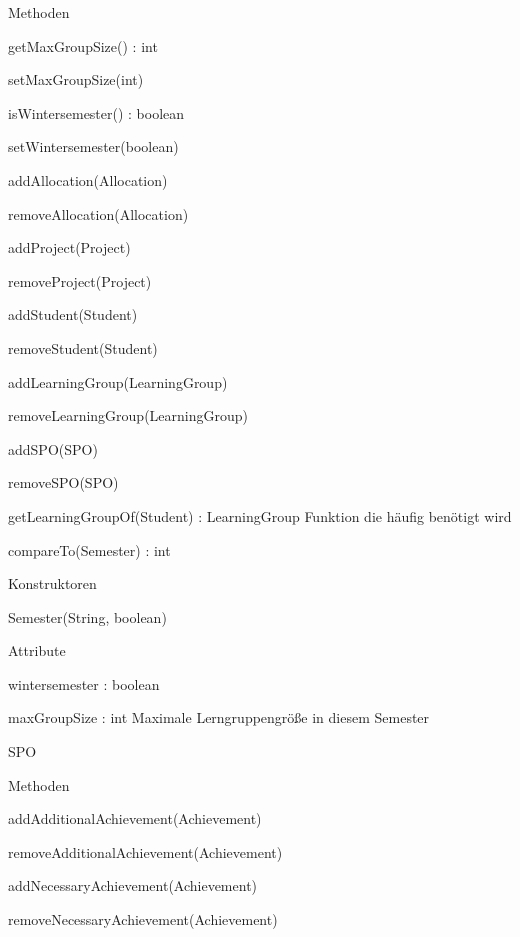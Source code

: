 \documentclass[parskip=full]{scrartcl}
\newcommand{\changeDescription}[1]{{\newline\color{black}\normalfont #1}}
\begin{document}
\begin{itemPackage}
\begin{itemClass}
\begin{itemClassSub}
\item Methoden
\begin{itemPlus}
\item getMaxGroupSize() : int
\item setMaxGroupSize(int)
\item isWintersemester() : boolean
\item setWintersemester(boolean)
\item addAllocation(Allocation)
\item removeAllocation(Allocation)
\item addProject(Project)
\item removeProject(Project)
\item addStudent(Student)
\item removeStudent(Student)
\item addLearningGroup(LearningGroup)
\item removeLearningGroup(LearningGroup)
\item addSPO(SPO)
\item removeSPO(SPO)
\item getLearningGroupOf(Student) : LearningGroup
\changeDescription{Funktion die häufig benötigt wird}
\item compareTo(Semester) : int
\end{itemPlus}
\item Konstruktoren
\begin{itemPlus}
\item Semester(String, boolean)
\end{itemPlus}
\item Attribute 
\begin{itemPlus}
\item wintersemester : boolean
\item maxGroupSize : int \changeDescription{Maximale Lerngruppengröße in diesem
Semester}
\end{itemPlus}
\end{itemClassSub}
\item SPO
\begin{itemClassSub}
\item Methoden
\begin{itemPlus}
\item addAdditionalAchievement(Achievement)
\item removeAdditionalAchievement(Achievement)
\item addNecessaryAchievement(Achievement)
\item removeNecessaryAchievement(Achievement)

\end{itemPlus}
\end{itemClassSub}
\end{itemClass}
\end{itemPackage}
\end{document}
